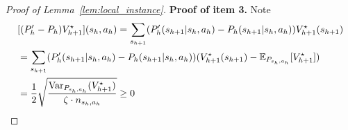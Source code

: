 \begin{proof}[Proof of Lemma~\ref{lem:local_instance}]
\textbf{Proof of item 3.} Note
\begin{align*}
&[(P'_h-P_h)V^\star_{h+1}](s_h,a_h)=\sum_{s_{h+1}}(P'_h(s_{h+1}|s_h,a_h)-P_h(s_{h+1}|s_h,a_h))V^\star_{h+1}(s_{h+1})\\
&=\sum_{s_{h+1}}(P'_h(s_{h+1}|s_h,a_h)-P_h(s_{h+1}|s_h,a_h))(V^\star_{h+1}(s_{h+1})-\mathbb{E}_{P_{s_h,a_h}}[V^\star_{h+1}])\\
&=\frac{1}{2}\sqrt{\frac{\mathrm{Var}_{P_{s_h,a_h}}(V^\star_{h+1})}{\zeta\cdot n_{s_h,a_h}}}\geq 0
\end{align*}
	
\end{proof}

















